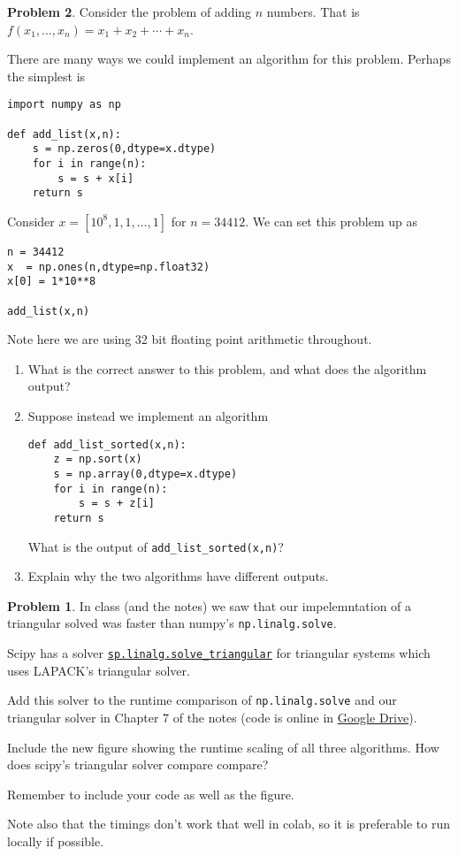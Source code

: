\documentclass[12pt]{article}
\theoremstyle{definition}
\newtheorem{problem}{Problem}
\begin{document}
\begin{problem}
Consider the problem of adding $n$ numbers. 
That is $f(x_1, \ldots, x_n) = x_1 + x_2 + \cdots + x_n$. 

There are many ways we could implement an algorithm for this problem. Perhaps the simplest is
\begin{lstlisting}
import numpy as np

def add_list(x,n):
    s = np.zeros(0,dtype=x.dtype)
    for i in range(n):
        s = s + x[i]
    return s
\end{lstlisting}

Consider $x = [10^{8},1,1,\ldots, 1]$ for $n=34412$.
We can set this problem up as
\begin{lstlisting}
n = 34412
x  = np.ones(n,dtype=np.float32)
x[0] = 1*10**8

add_list(x,n)
\end{lstlisting}

Note here we are using 32 bit floating point arithmetic throughout. 

    \begin{enumerate}
        \item
            What is the correct answer to this problem, and what does the algorithm output?

        \item Suppose instead we implement an algorithm
\begin{lstlisting}
def add_list_sorted(x,n):
    z = np.sort(x)
    s = np.array(0,dtype=x.dtype)
    for i in range(n):
        s = s + z[i]
    return s
\end{lstlisting}
    What is the output of \lstinline{add_list_sorted(x,n)}?

\item Explain why the two algorithms have different outputs.
    \end{enumerate}


\clearpage
\begin{problem}

    In class (and the notes) we saw that our impelemntation of a triangular solved was faster than numpy's \lstinline{np.linalg.solve}.

    Scipy has a solver \href{https://docs.scipy.org/doc/scipy/reference/generated/scipy.linalg.solve_triangular.html}{\lstinline{sp.linalg.solve_triangular}} for triangular systems which uses LAPACK's triangular solver.

    Add this solver to the runtime comparison of \lstinline{np.linalg.solve} and our triangular solver in Chapter 7 of the notes (code is online in \href{https://drive.google.com/drive/u/0/folders/17mCJ0l6Sc4sKMXJPEklNQuDfrS6X4jcC}{Google Drive}).
    
    Include the new figure showing the runtime scaling of all three algorithms.
    How does scipy's triangular solver compare compare?

    Remember to include your code as well as the figure.

    Note also that the timings don't work that well in colab, so it is preferable to run locally if possible.

\end{problem}
\end{problem}
\end{document}
